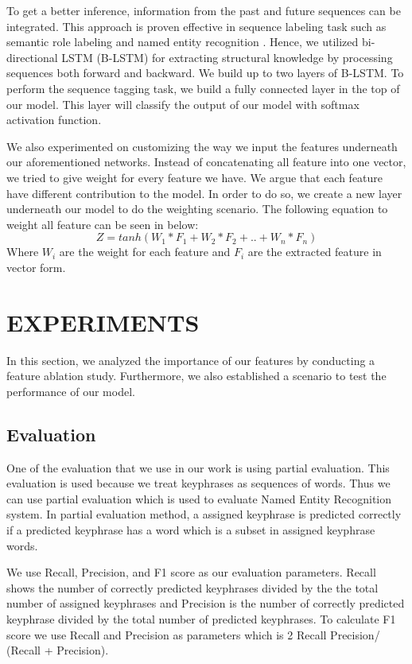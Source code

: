 To get a better inference, information from the past and future sequences can be integrated. This approach is proven effective  in sequence labeling task such as semantic role labeling \cite{SMRzhou2015end} and named entity recognition \cite{ma2016end}. Hence, we utilized  bi-directional LSTM (B-LSTM) for extracting structural knowledge by processing sequences both forward and backward. We build up to two layers of B-LSTM.
To perform the sequence tagging task, we build a fully connected layer in the top of our model. This layer will classify the output of our model with softmax activation function.

We also experimented on customizing the way we input the features underneath our aforementioned networks. Instead of concatenating all feature into one vector, we tried to give weight for every feature we have. We argue that each feature have different contribution to the model. In order to do so, we create a new layer underneath our model to do the weighting scenario. The following equation to weight all feature can be seen in below:
\begin{equation}
Z =  tanh(W _{1}*F_{1} + W_{2}*F_{2} + .. + W_{n}*F_{n})
\end{equation}
Where $W_{i}$ are the weight for each feature and $F_{i}$ are the extracted feature in vector form.
\section{EXPERIMENTS}
In this section, we analyzed the importance of our features by conducting a feature ablation study. Furthermore, we also established a scenario to test the performance of our model.
\subsection{Evaluation}
One of the evaluation that we use in our work is using partial evaluation. This evaluation is used because we treat keyphrases as sequences of words. Thus we can use partial evaluation which is used to evaluate Named Entity Recognition system. In partial evaluation method, a assigned keyphrase is predicted correctly if a predicted keyphrase has a word which is a subset in assigned keyphrase words. 

We use Recall, Precision, and F1 score as our evaluation parameters. Recall shows the number of correctly predicted keyphrases divided by the the total number of assigned keyphrases and Precision is the number of correctly predicted keyphrase divided by the total number of predicted keyphrases. To calculate F1 score we use Recall and Precision as parameters which is 2  Recall  Precision/ (Recall + Precision).
